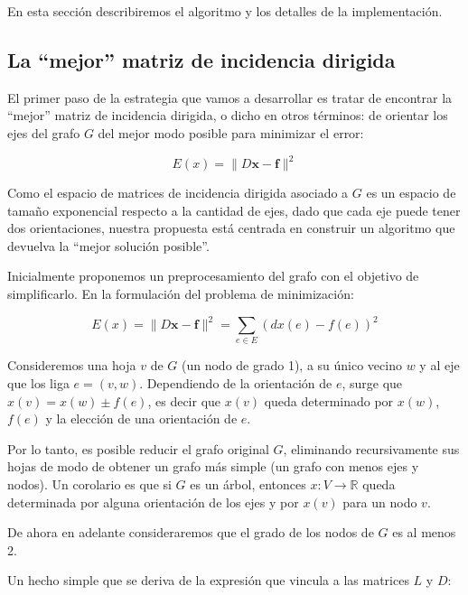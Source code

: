 \documentclass[conference,compsoc,a4paper]{IEEEtran}
\begin{document}
En esta sección describiremos el algoritmo y los detalles de la 
implementación.

\subsection{La ``mejor'' matriz de incidencia dirigida}

El primer paso de la estrategia que vamos a desarrollar es tratar de 
encontrar la ``mejor'' matriz de incidencia dirigida, o dicho en otros 
términos: de orientar los ejes del grafo $G$ del mejor modo posible para 
minimizar el error:

$$E(x) = \|D\bm{x}-\bm{f}\|^2$$
 
Como el espacio de matrices de incidencia dirigida asociado a $G$ es un 
espacio de tamaño exponencial respecto a la cantidad de ejes, dado que 
cada eje puede tener dos orientaciones, nuestra propuesta está centrada 
en construir un algoritmo que devuelva la ``mejor solución posible''.

\bigskip


Inicialmente proponemos un preprocesamiento del grafo con el objetivo de 
simplificarlo. En la formulación del problema de minimización:

$$E(x) = \|D\bm{x}-\bm{f}\|^2 = \sum_{e \in E} (dx(e) - f(e))^2$$

Consideremos una hoja $v$ de $G$ (un nodo de grado 1), a su único 
vecino $w$ y al eje que los liga $e=(v,w)$. Dependiendo de la 
orientación de $e$, surge que $x(v) = x(w) \pm 
f(e)$, es decir que $x(v)$ queda determinado por $x(w)$, $f(e)$ y la 
elección de una orientación de $e$.

\smallskip

Por lo tanto, es posible reducir el grafo original $G$, eliminando 
recursivamente sus  hojas de modo de obtener un grafo más simple (un 
grafo con menos ejes y nodos).
Un corolario es que si $G$ es un árbol, entonces $x: V 
\rightarrow \mathbb{R}$ queda determinada por alguna orientación de 
los ejes y por $x(v)$ para un nodo $v$.

\smallskip

De ahora en adelante consideraremos que el grado de los nodos de $G$ es 
al menos 2.
 
\bigskip


Un hecho simple que se deriva de la expresión que vincula a las matrices 
$L$ y $D$:
\end{document}
